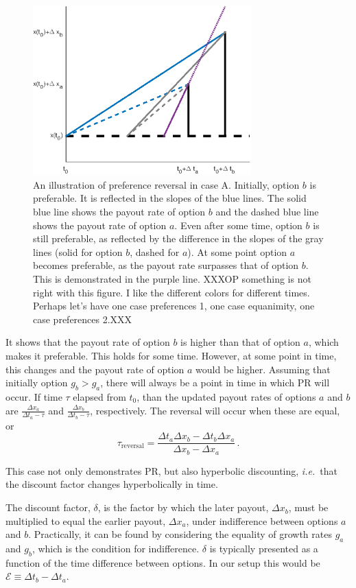 \documentclass[11pt]{article}
\newcommand{\ie}{{\it i.e.}\ }
\newcommand{\flabel}[1]{\label{fig:#1}}
\newcommand{\be}{\begin{equation}}
\newcommand{\ee}{\end{equation}}
\newcommand{\Dt}{\Delta t}
\newcommand{\Dx}{\Delta x}
\newcommand{\Epsilon}{\mathcal{E}}
\numberwithin{equation}{section}
\begin{document}
\begin{figure}[!htb]
\centering
\includegraphics[width=0.75\textwidth]{./figures/case_A.eps}
\caption{An illustration of preference reversal in case A. Initially, option $b$ is preferable. It is reflected in the slopes of the blue lines. The solid blue line shows the payout rate of option $b$ and the dashed blue line shows the payout rate of option $a$. Even after some time, option $b$ is still preferable, as reflected by the difference in the slopes of the gray lines (solid for option $b$, dashed for $a$). At some point option $a$ becomes preferable, as the payout rate surpasses that of option $b$. This is demonstrated in the purple line.
XXXOP something is not right with this figure. I like the different colors for different times. Perhaps let's have one case preferences 1, one case equanimity, one case preferences 2.XXX}
\flabel{caseA}
\end{figure}

It shows that the payout rate of option $b$ is higher than that of option $a$, which makes it preferable. This holds for some time. However, at some point in time, this changes and the payout rate of option $a$ would be higher. Assuming that initially option $g_b > g_a$, there will always be a point in time in which PR will occur. If time $\tau$ elapsed from $t_0$, than the updated payout rates of options $a$ and $b$ are $\frac{\Dx_a}{\Dt_a - \tau}$ and $\frac{\Dx_b}{\Dt_b - \tau}$, respectively. The reversal will occur when these are equal, or
\be
\tau_{\text{reversal}} = \frac{\Dt_a\Dx_b - \Dt_b\Dx_a}{\Dx_b - \Dx_a}\,.
\ee

This case not only demonstrates PR, but also hyperbolic discounting, \ie that the discount factor changes hyperbolically in time.

The discount factor, $\delta$, is the factor by which the later payout, $\Dx_b$, must be multiplied to equal the earlier payout, $\Dx_a$, under indifference between options $a$ and $b$. Practically, it can be found by considering the equality of growth rates $g_a$ and $g_b$, which is the condition for indifference. $\delta$ is typically presented as a function of the time difference between options. In our setup this would be $\Epsilon \equiv \Dt_b - \Dt_a$.
\end{document}
